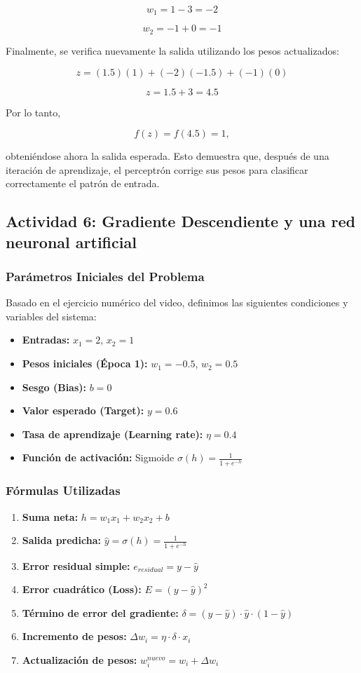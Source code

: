 \documentclass[12pt]{article}
\begin{document}
\[
w_1=1-3=-2
\]

\[
w_2=-1+0=-1
\]

Finalmente, se verifica nuevamente la salida utilizando los pesos actualizados:

\[
z=(1.5)(1)+(-2)(-1.5)+(-1)(0)
\]

\[
z=1.5+3=4.5
\]

Por lo tanto,

\[
f(z)=f(4.5)=1,
\]

obteniéndose ahora la salida esperada. Esto demuestra que, después de una iteración de aprendizaje, el perceptrón corrige sus pesos para clasificar correctamente el patrón de entrada.

\subsection{Actividad 6: Gradiente Descendiente y una red neuronal artificial}
\subsubsection*{Parámetros Iniciales del Problema}
Basado en el ejercicio numérico del video, definimos las siguientes condiciones y variables del sistema:
\begin{itemize}
    \item \textbf{Entradas:} $x_1 = 2$, $x_2 = 1$
    \item \textbf{Pesos iniciales (Época 1):} $w_1 = -0.5$, $w_2 = 0.5$
    \item \textbf{Sesgo (Bias):} $b = 0$
    \item \textbf{Valor esperado (Target):} $y = 0.6$
    \item \textbf{Tasa de aprendizaje (Learning rate):} $\eta = 0.4$
    \item \textbf{Función de activación:} Sigmoide $\sigma(h) = \frac{1}{1 + e^{-h}}$
\end{itemize}

\subsubsection*{Fórmulas Utilizadas}
\begin{enumerate}
    \item \textbf{Suma neta:} $h = w_1x_1 + w_2x_2 + b$
    \item \textbf{Salida predicha:} $\hat{y} = \sigma(h) = \frac{1}{1 + e^{-h}}$
    \item \textbf{Error residual simple:} $e_{residual} = y - \hat{y}$
    \item \textbf{Error cuadrático (Loss):} $E = (y - \hat{y})^2$
    \item \textbf{Término de error del gradiente:} $\delta = (y - \hat{y}) \cdot \hat{y} \cdot (1 - \hat{y})$
    \item \textbf{Incremento de pesos:} $\Delta w_i = \eta \cdot \delta \cdot x_i$
    \item \textbf{Actualización de pesos:} $w_i^{nuevo} = w_i + \Delta w_i$
\end{enumerate}
\end{document}
